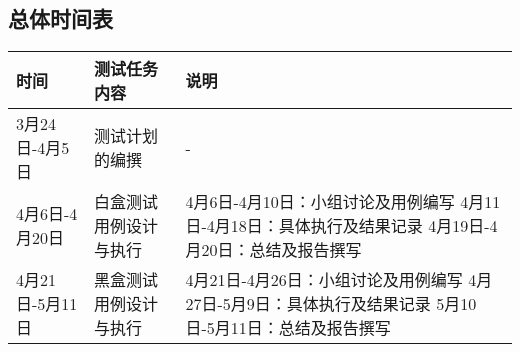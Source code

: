 \documentclass[hyperref, a4paper]{ctexart}
\begin{document}
\hypertarget{ux603bux4f53ux65f6ux95f4ux8868}{%
\subsection{总体时间表}\label{ux603bux4f53ux65f6ux95f4ux8868}}

\begin{longtable}[]{@{}lll@{}}
\toprule
\begin{minipage}[b]{0.13\columnwidth}\raggedright
时间\strut
\end{minipage} & \begin{minipage}[b]{0.28\columnwidth}\raggedright
测试任务内容\strut
\end{minipage} & \begin{minipage}[b]{0.50\columnwidth}\raggedright
说明\strut
\end{minipage}\tabularnewline
\midrule
\endhead
\begin{minipage}[t]{0.13\columnwidth}\raggedright
3月24日-4月5日\strut
\end{minipage} & \begin{minipage}[t]{0.28\columnwidth}\raggedright
测试计划的编撰\strut
\end{minipage} & \begin{minipage}[t]{0.50\columnwidth}\raggedright
-\strut
\end{minipage}\tabularnewline
\begin{minipage}[t]{0.13\columnwidth}\raggedright
4月6日-4月20日\strut
\end{minipage} & \begin{minipage}[t]{0.28\columnwidth}\raggedright
白盒测试用例设计与执行\strut
\end{minipage} & \begin{minipage}[t]{0.50\columnwidth}\raggedright
4月6日-4月10日：小组讨论及用例编写 4月11日-4月18日：具体执行及结果记录
4月19日-4月20日：总结及报告撰写\strut
\end{minipage}\tabularnewline
\begin{minipage}[t]{0.13\columnwidth}\raggedright
4月21日-5月11日\strut
\end{minipage} & \begin{minipage}[t]{0.28\columnwidth}\raggedright
黑盒测试用例设计与执行\strut
\end{minipage} & \begin{minipage}[t]{0.50\columnwidth}\raggedright
4月21日-4月26日：小组讨论及用例编写 4月27日-5月9日：具体执行及结果记录
5月10日-5月11日：总结及报告撰写\strut
\end{minipage}\tabularnewline

\end{longtable}
\end{document}
